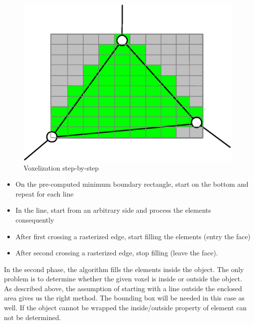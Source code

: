 \begin{figure}
\includegraphics[scale=0.25]{../img/voxelize_4.eps}

\caption{Voxelization step-by-step}
\label{fig:voxelize}

\end{figure}

\begin{itemize}
\item On the pre-computed minimum boundary rectangle, start on the bottom and repeat for each line
\item In the line, start from an arbitrary side and process the elements consequently
\item After first crossing a rasterized edge, start filling the elements (entry the face)
\item After second crossing a rasterized edge, stop filling (leave the face).

\end{itemize}
In the second phase, the algorithm fills the elements inside the object. The only problem is to
determine whether the given voxel is inside or outside the object. As described above, the assumption of
starting with a line outside the enclosed area gives us the right method. The
bounding box will be needed in this case as well. If the object cannot be wrapped
the inside/outside property of element can not be determined.
